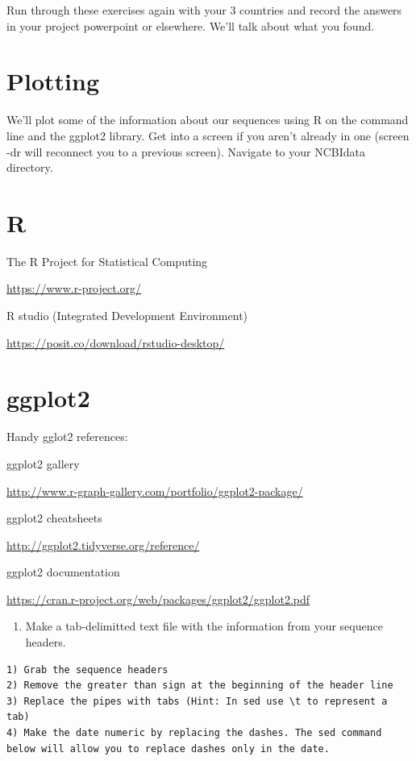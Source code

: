 \documentclass[
]{book}
\providecommand{\tightlist}{%
  \setlength{\itemsep}{0pt}\setlength{\parskip}{0pt}}
\begin{document}
Run through these exercises again with your 3 countries and record the answers in your project powerpoint or elsewhere. We'll talk about what you found.

\hypertarget{plotting}{%
\section{Plotting}\label{plotting}}

We'll plot some of the information about our sequences using R on the command line and the ggplot2 library. Get into a screen if you aren't already in one (screen -dr will reconnect you to a previous screen). Navigate to your NCBIdata directory.

\hypertarget{r}{%
\section{R}\label{r}}

The R Project for Statistical Computing

\url{https://www.r-project.org/}

R studio (Integrated Development Environment)

\url{https://posit.co/download/rstudio-desktop/}

\hypertarget{ggplot2}{%
\section{ggplot2}\label{ggplot2}}

Handy gglot2 references:

ggplot2 gallery

\url{http://www.r-graph-gallery.com/portfolio/ggplot2-package/}

ggplot2 cheatsheets

\url{http://ggplot2.tidyverse.org/reference/}

ggplot2 documentation

\url{https://cran.r-project.org/web/packages/ggplot2/ggplot2.pdf}

\hfill\break

\begin{enumerate}
\def\labelenumi{\arabic{enumi}.}
\setcounter{enumi}{10}
\tightlist
\item
  Make a tab-delimitted text file with the information from your sequence headers.
\end{enumerate}

\begin{verbatim}
1) Grab the sequence headers
2) Remove the greater than sign at the beginning of the header line
3) Replace the pipes with tabs (Hint: In sed use \t to represent a tab)
4) Make the date numeric by replacing the dashes. The sed command below will allow you to replace dashes only in the date.
\end{verbatim}
\end{document}
